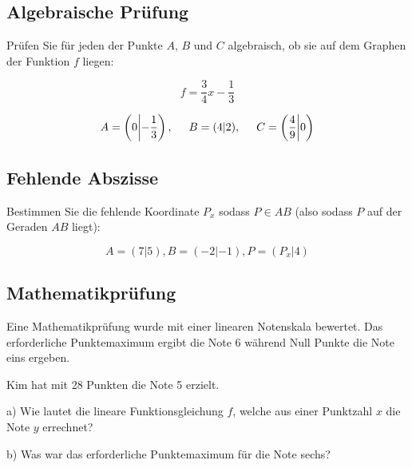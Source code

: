 \subsection{Algebraische Prüfung}
Prüfen Sie für jeden der Punkte $A$, $B$ und $C$ algebraisch, ob sie auf dem
Graphen der Funktion $f$ liegen:

$$f = \frac34x-\frac13$$

$$A = \left(0\middle|-\frac13\right), \hspace{5mm} B =
(4|2), \hspace{5mm} C = \left(\frac49\middle|0\right)$$


\subsection{Fehlende Abszisse}

Bestimmen Sie die fehlende Koordinate $P_x$ sodass $P\in AB$ (also
sodass $P$ auf der Geraden $AB$ liegt):

$$A=(7|5), B=(-2|-1), P=(P_x|4)$$


\subsection{Mathematikprüfung}
Eine Mathematikprüfung wurde mit einer linearen Notenskala bewertet.
Das erforderliche Punktemaximum ergibt die Note 6 während Null Punkte
die Note eins ergeben.

Kim hat mit 28 Punkten die Note 5 erzielt.

a) Wie lautet die lineare Funktionsgleichung $f$, welche aus einer
Punktzahl $x$ die Note $y$ errechnet?


b) Was war das erforderliche Punktemaximum für die Note sechs?





